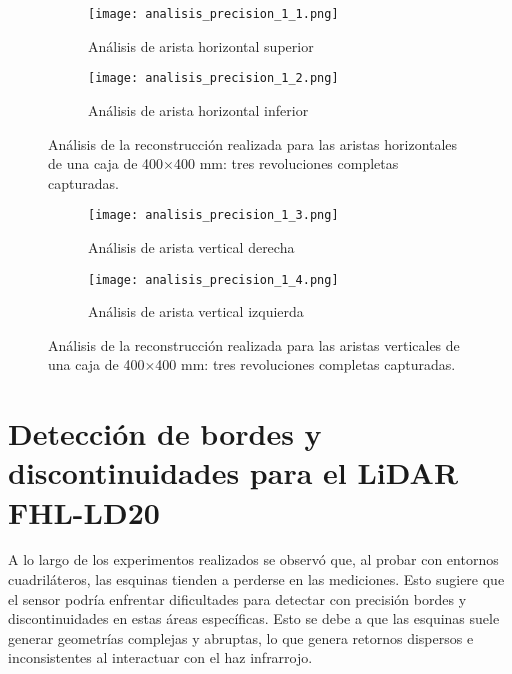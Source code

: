 \begin{figure}[H]
	\centering
	\begin{subfigure}{0.8\textwidth}
		\centering
		\texttt{[image: analisis\_precision\_1\_1.png]}
		\caption{Análisis de arista horizontal superior}
		\label{analisis_precision_1_1}
	\end{subfigure}
	\hspace{1em}
	\begin{subfigure}{0.8\textwidth}
		\centering
		\texttt{[image: analisis\_precision\_1\_2.png]}
		\caption{Análisis de arista horizontal inferior}
		\label{analisis_precision_1_2}
		\vspace{1em}
	\end{subfigure}
	\caption{Análisis de la reconstrucción realizada para las aristas horizontales de una caja de 400$\times$400 mm: tres revoluciones completas capturadas.}
	\label{fig: reconstruccion_analisis_horizontal_1}
\end{figure}
\begin{figure}[H]
	\centering
	\begin{subfigure}{0.45\textwidth}
		\centering
		\texttt{[image: analisis\_precision\_1\_3.png]}
		\caption{Análisis de arista vertical derecha}
		\label{analisis_precision_1_3}
	\end{subfigure}
	\hspace{1em}
	\begin{subfigure}{0.45\textwidth}
		\centering
		\texttt{[image: analisis\_precision\_1\_4.png]}
		\caption{Análisis de arista vertical izquierda}
		\label{analisis_precision_1_4}
	\end{subfigure}
	\caption{Análisis de la reconstrucción realizada para las aristas verticales de una caja de 400$\times$400 mm: tres revoluciones completas capturadas.}
	\label{fig: reconstruccion_analisis_vertical_1}
\end{figure}

\section{Detección de bordes y discontinuidades para el LiDAR FHL-LD20}
A lo largo de los experimentos realizados se observó que, al probar con entornos cuadriláteros, las esquinas tienden a perderse en las mediciones. Esto sugiere que el sensor podría enfrentar dificultades para detectar con precisión bordes y discontinuidades en estas áreas específicas. Esto se debe a que las esquinas suele generar geometrías complejas y abruptas, lo que genera retornos dispersos e inconsistentes al interactuar con el haz infrarrojo.

